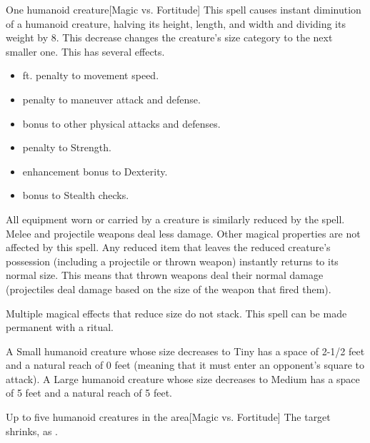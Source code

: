 \spellrng{\rngclose}
\spelldur{\durshort \dismissable}
\begin{spelltarget}{One humanoid creature}[Magic vs. Fortitude]
    \spellsuccess This spell causes instant diminution of a humanoid creature, halving its height, length, and width and dividing its weight by 8. This decrease changes the creature's size category to the next smaller one. This has several effects.
    \begin{itemize} 
        \item {} ft. penalty to movement speed.
        \item {} penalty to maneuver attack and defense.
        \item {} bonus to other physical attacks and defenses.
        \item {} penalty to Strength.
        \item {} enhancement bonus to Dexterity.
        \item {} bonus to Stealth checks.
    \end{itemize}
    \par All equipment worn or carried by a creature is similarly reduced by the spell. Melee and projectile weapons deal less damage. Other magical properties are not affected by this spell. Any reduced item that leaves the reduced creature's possession (including a projectile or thrown weapon) instantly returns to its normal size. This means that thrown weapons deal their normal damage (projectiles deal damage based on the size of the weapon that fired them).
\end{spelltarget}
\spellnotes Multiple magical effects that reduce size do not stack. This spell can be made permanent with a  ritual.
\par A Small humanoid creature whose size decreases to Tiny has a space of 2-1/2 feet and a natural reach of 0 feet (meaning that it must enter an opponent's square to attack). A Large humanoid creature whose size decreases to Medium has a space of 5 feet and a natural reach of 5 feet.

\spelldur{\durshort \dismissable}
\begin{spelltargets}{Up to five humanoid creatures in the area}[Magic vs. Fortitude]
    \spellsuccess The target shrinks, as .
\end{spelltargets}

